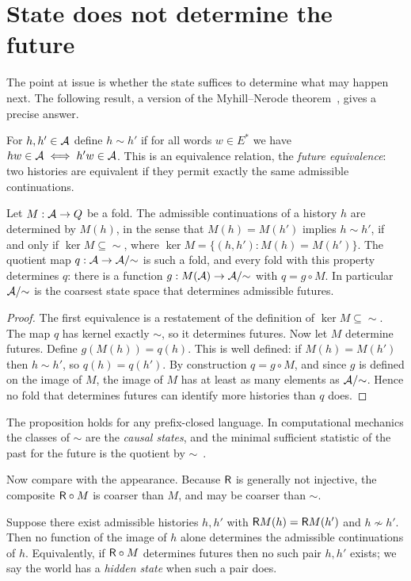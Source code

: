 \section{State does not determine the future}

The point at issue is whether the state suffices to determine what may happen next. The following result, a version of the Myhill--Nerode theorem~\cite{hopcroft2006}, gives a precise answer.

For $h,h'\in\mathcal{A}$ define $h\sim h'$ if for all words $w\in E^*$ we have $hw\in\mathcal{A}\iff h'w\in\mathcal{A}$. This is an equivalence relation, the \emph{future equivalence}: two histories are equivalent if they permit exactly the same admissible continuations.

\begin{proposition}\label{prop:nerode}
Let $M:\mathcal{A}\to Q$ be a fold. The admissible continuations of a history $h$ are determined by $M(h)$, in the sense that $M(h)=M(h')$ implies $h\sim h'$, if and only if $\ker M\subseteq{\sim}$, where $\ker M=\{(h,h'):M(h)=M(h')\}$. The quotient map $q:\mathcal{A}\to\mathcal{A}/{\sim}$ is such a fold, and every fold with this property determines $q$: there is a function $g:M(\mathcal{A})\to\mathcal{A}/{\sim}$ with $q=g\circ M$. In particular $\mathcal{A}/{\sim}$ is the coarsest state space that determines admissible futures.
\end{proposition}

\begin{proof}
The first equivalence is a restatement of the definition of $\ker M\subseteq{\sim}$. The map $q$ has kernel exactly $\sim$, so it determines futures. Now let $M$ determine futures. Define $g(M(h))=q(h)$. This is well defined: if $M(h)=M(h')$ then $h\sim h'$, so $q(h)=q(h')$. By construction $q=g\circ M$, and since $g$ is defined on the image of $M$, the image of $M$ has at least as many elements as $\mathcal{A}/{\sim}$. Hence no fold that determines futures can identify more histories than $q$ does.
\end{proof}

The proposition holds for any prefix-closed language. In computational mechanics the classes of $\sim$ are the \emph{causal states}, and the minimal sufficient statistic of the past for the future is the quotient by $\sim$~\cite{shalizi2001}.

Now compare with the appearance. Because $\mathsf{R}$ is generally not injective, the composite $\mathsf{R}\circ M$ is coarser than $M$, and may be coarser than $\sim$.

\begin{proposition}\label{prop:appearance}
Suppose there exist admissible histories $h,h'$ with $\mathsf{R} M(h)=\mathsf{R} M(h')$ and $h\not\sim h'$. Then no function of the image of $h$ alone determines the admissible continuations of $h$. Equivalently, if $\mathsf{R}\circ M$ determines futures then no such pair $h,h'$ exists; we say the world has a \emph{hidden state} when such a pair does.
\end{proposition}


